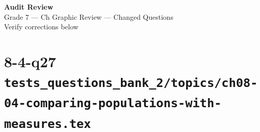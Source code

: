 \documentclass[12pt, fleqn, openany]{studyGuide}
\begin{document}
\begin{center}
\begin{tcolorbox}[
	enhanced,
	colback=white,
	colframe=funTeal!60,
	boxrule=1.5pt,
	arc=10pt,
	outer arc=10pt,
	width=0.9\linewidth,
	halign=center,
	top=5mm, bottom=5mm,
]
	{\Large\bfseries\sffamily\color{funTealDark}Audit Review}\\[2mm]
	{\large\sffamily\color{funGrayDark}Grade 7 --- Ch Graphic Review --- Changed Questions}\\[2mm]
	{\normalsize\sffamily\color{funGrayDark}Verify corrections below}
\end{tcolorbox}
\end{center}

\newpage
\section*{8-4-q27 \hfill \normalsize\texttt{tests\_questions\_bank\_2/topics/ch08-04-comparing-populations-with-measures.tex}}
\end{document}
